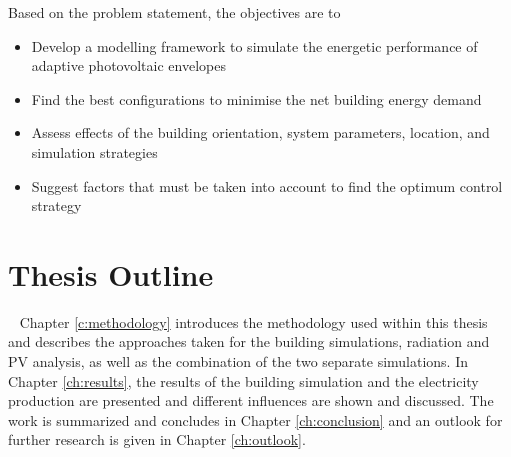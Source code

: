 	Based on the problem statement, the objectives are to

	\begin{itemize}
		\item Develop a modelling framework to simulate the energetic performance of adaptive photovoltaic envelopes
		\item Find the best configurations to minimise the net building energy demand
		\item Assess effects of the building orientation, system parameters, location, and simulation strategies
		\item Suggest factors that must be taken into account to find the optimum control strategy
	\end{itemize}


\section{Thesis Outline}\
	Chapter \ref{c:methodology} introduces the methodology used within this thesis and describes the approaches taken for the building simulations, radiation and PV analysis, as well as the combination of the two separate simulations. In Chapter \ref{ch:results}, the results of the building simulation and the electricity production are presented and different influences are shown and discussed. The work is summarized and concludes in Chapter \ref{ch:conclusion} and an outlook for further research is given in Chapter \ref{ch:outlook}. 

